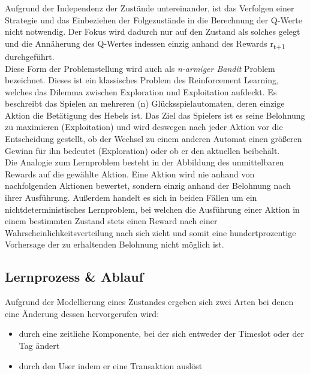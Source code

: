 Aufgrund der In­de­pen­denz der Zustände untereinander, ist das Verfolgen einer Strategie und das Einbeziehen der Folgezustände in die Berechnung der Q-Werte nicht notwendig. Der Fokus wird dadurch nur auf den Zustand als solches gelegt und die Annäherung des  Q-Wertes indessen einzig anhand des Rewards r\textsubscript{t+1} durchgeführt. \\
Diese Form der Problemstellung wird auch als \textit{n-armiger Bandit} Problem bezeichnet. Dieses ist ein klassisches Problem des Reinforcement Learning, welches das Dilemma zwischen Exploration und Exploitation aufdeckt. Es beschreibt das Spielen an mehreren (n) Glücksspielautomaten, deren einzige Aktion die Betätigung des Hebels ist. Das Ziel das Spielers ist es seine Belohnung zu maximieren (Exploitation) und wird deswegen nach jeder Aktion vor die Entscheidung gestellt, ob der Wechsel zu einem anderen Automat einen größeren Gewinn für ihn bedeutet (Exploration) oder ob er den aktuellen beibehält. \\
Die Analogie zum Lernproblem besteht in der Abbildung des unmittelbaren Rewards auf die gewählte Aktion. Eine Aktion wird nie anhand von nachfolgenden Aktionen bewertet, sondern einzig anhand der Belohnung nach ihrer Ausführung. Außerdem handelt es sich in beiden Fällen um ein nichtdeterministisches Lernproblem, bei welchen die Ausführung einer Aktion in einem bestimmten Zustand stets einen Reward nach einer Wahrscheinlichkeitsverteilung nach sich zieht und somit eine hundertprozentige Vorhersage der zu erhaltenden Belohnung nicht möglich ist. \cite{Sutton}
	
\subsection{Lernprozess \& Ablauf}
\label{subsec:learning}

Aufgrund der Modellierung eines Zustandes ergeben sich zwei Arten bei denen eine Änderung dessen hervorgerufen wird: 
\begin{itemize}
	\item durch eine zeitliche Komponente, bei der sich entweder der Timeslot oder der Tag ändert
	\item durch den User indem er eine Transaktion auslöst
\end{itemize}

